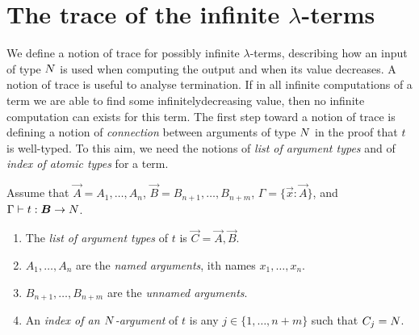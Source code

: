 
\section{The trace of the infinite $\lambda$-terms}
We define a notion of trace for possibly infinite $\lambda$-terms, 
describing how an input of type ${N}$ is used when computing the output
and when its value decreases. A notion of trace is useful to analyse termination.
If in all infinite computations of a term we are able to find some infinitelydecreasing value, then no infinite computation can exists for this term. 
The first step toward a notion of  trace is defining a notion of \emph{connection} 
between arguments of type ${N}$ in the proof that $t$ is well-typed. 
To this aim, we need the notions of \emph{list of argument
 types} and of \emph{index of atomic types} for a term.

%
%


\begin{definition}
Assume that $\vec{A} = A_1, \ldots, A_n$, $\vec{B}=B_{n+1}, \ldots, B_{n+m}$, 
$\Gamma = \{\vec{x}:\vec{A}\}$,
and $\Gamma \vdash t: \vec{B} \rightarrow \N$.

\begin{enumerate}
\item
The \emph{list of argument types} of $t$ is $\vec{C} = \vec{A},\vec{B}$. 

\item
$A_1, \ldots, A_n$ are the \emph{named arguments}, 
ith names $x_1, \ldots, x_n$.

\item
$B_{n+1}, \ldots, B_{n+m}$ are the \emph{unnamed arguments}.

\item
An \emph{index of an ${N}$-argument} 
of $t$ is any $j \in \{1, \ldots, n+m\}$ such that $C_j = {N}$.

\end{enumerate}
\end{definition}


